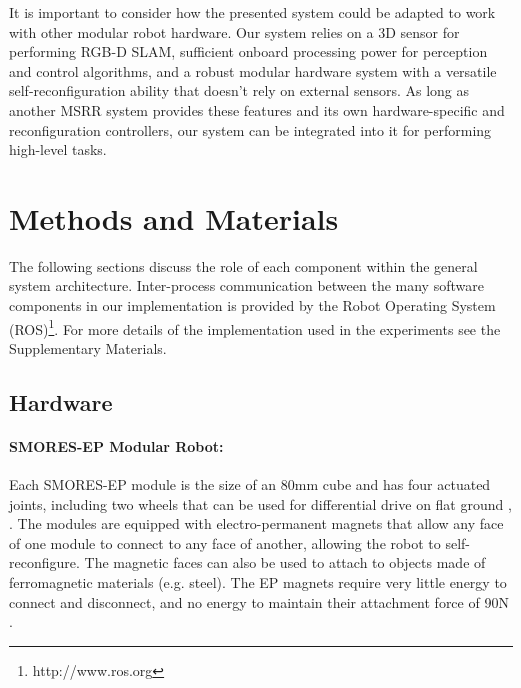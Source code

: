 \documentclass[12pt]{article}
\begin{document}
It is important to consider how the presented system could be adapted to work with
other modular robot hardware. Our system relies on a 3D sensor for performing RGB-D
SLAM, sufficient onboard processing power for perception and control algorithms,
and a robust modular hardware system with a versatile self-reconfiguration ability
that doesn't rely on external sensors. As long as another MSRR system provides these
features and its own hardware-specific and reconfiguration controllers, our system
can be integrated into it for performing high-level tasks.
%



\section{Methods and Materials}\label{sec:system}
%
The following sections discuss the role of each component within the general system architecture. Inter-process communication between the many software components in our implementation is provided by the Robot Operating System (ROS)\footnote{http://www.ros.org}. For more details of the implementation used in the experiments see the Supplementary Materials.

%


\subsection{Hardware} %
\label{sec:hardware}
%
\paragraph{SMORES-EP Modular Robot:} \label{sec:smores}
%
Each SMORES-EP module is the size of an 80mm cube
and has four actuated joints, including two wheels that can be
used for differential drive on flat ground \cite{tosun2016design},
\cite{tosun2017paintpots}.  The modules are equipped
with electro-permanent magnets that allow any face of one module to connect to
any face of another, allowing the robot to self-reconfigure. The magnetic faces
can also be used to attach to objects made of ferromagnetic materials (e.g. steel). 
The EP magnets require very little energy to connect and disconnect, and no energy to maintain their attachment force of 90N \cite{tosun2016design}.
\end{document}
